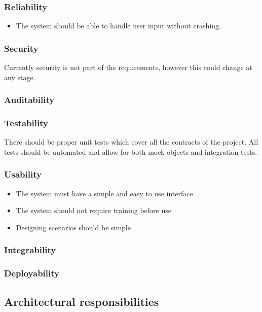 \documentclass[a4paper,12pt]{article}
\begin{document}
\subsubsection{Reliability}
	\begin{itemize}
		\item The system should be able to handle user input without crashing.
	\end{itemize}

\subsubsection{Security}
Currently security is not part of the requirements, however this could change at any stage.

\subsubsection{Auditability}

\subsubsection{Testability}
There should be proper unit tests which cover all the contracts of the project. All tests should be automated and allow for both mock objects and integration tests.

\subsubsection{Usability}
	\begin{itemize}
		\item The system must have a simple and easy to use interface
		\item The system should not require training before use
		\item Designing scenarios should be simple
	\end{itemize}

\subsubsection{Integrability}

\subsubsection{Deployability}

\subsection{Architectural responsibilities}
\end{document}
